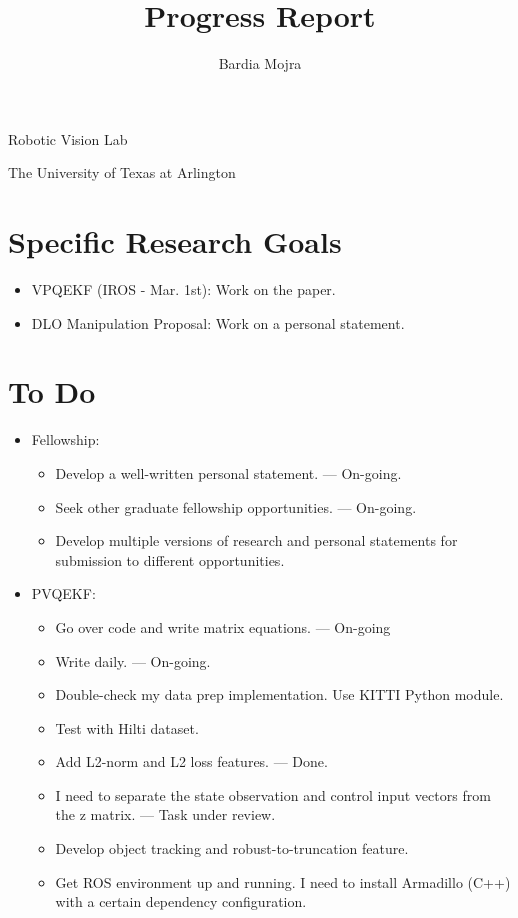 \documentclass[11pt]{article}
\title{Progress Report}
\author{Bardia Mojra}
\begin{document}
\maketitle
\thispagestyle{empty}

\bigskip
\bigskip
\begin{center}
      Robotic Vision Lab
\end{center}

\begin{center}
      The University of Texas at Arlington
\end{center}

\newpage

\section{Specific Research Goals}
\begin{itemize}
      \item VPQEKF (IROS - Mar. 1st): Work on the paper.
      \item DLO Manipulation Proposal: Work on a personal statement.
\end{itemize}

\section{To Do}
\begin{itemize}
  \item Fellowship:
  \begin{itemize}
      \item Develop a well-written personal statement. --- On-going.
      \item Seek other graduate fellowship opportunities. --- On-going.
      \item Develop multiple versions of research and personal statements for
      submission to different opportunities.
  \end{itemize}
  \item PVQEKF:
  \begin{itemize}
      \item Go over code and write matrix equations. --- On-going
      \item Write daily. --- On-going.
      \item Double-check my data prep implementation. Use KITTI Python module.
      \item Test with Hilti dataset.
      \item Add L2-norm and L2 loss features. --- Done.
      \item I need to separate the state observation and control input vectors from the z matrix. --- Task under review.
      \item Develop object tracking and robust-to-truncation feature.
      \item Get ROS environment up and running. I need to install Armadillo (C++) with a certain dependency configuration.
  \end{itemize}
\end{itemize}
\end{document}
